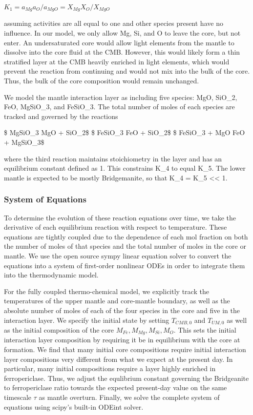 \documentclass[]{article}
\begin{document}
​ \(K_{1} = a_{Mg}a_{O} / a_{MgO} = X_{Mg} X_O / X_{MgO}\)

assuming activities are all equal to one and other species present have
no influence. In our model, we only allow Mg, Si, and O to leave the
core, but not enter. An undersaturated core would allow light elements
from the mantle to dissolve into the core fluid at the CMB. However,
this would likely form a thin stratified layer at the CMB heavily
enriched in light elements, which would prevent the reaction from
continuing and would not mix into the bulk of the core. Thus, the bulk
of the core composition would remain unchanged.

We model the mantle interaction layer as including five species: MgO,
SiO\_2, FeO, MgSiO\_3, and FeSiO\_3. The total number of moles of each
species are tracked and governed by the reactions

\$ MgSiO\_3 \leftrightarrow MgO + SiO\_2\$ \$ FeSiO\_3
\leftrightarrow FeO + SiO\_2\$ \$ FeSiO\_3 + MgO \leftrightarrow FeO +
MgSiO\_3\$

where the third reaction maintains stoichiometry in the layer and has an
equilibrium constant defined as 1. This constrains K\_4 to equal K\_5.
The lower mantle is expected to be mostly Bridgemanite, so that K\_4 =
K\_5 \textless{}\textless{} 1.

\hypertarget{system-of-equations}{%
\subsubsection{System of Equations}\label{system-of-equations}}

To determine the evolution of these reaction equations over time, we
take the derivative of each equilibrium reaction with respect to
temperature. These equations are tightly coupled due to the dependence
of each mol fraction on both the number of moles of that species and the
total number of moles in the core or mantle. We use the open source
sympy linear equation solver to convert the equations into a system of
first-order nonlinear ODEs in order to integrate them into the
thermodynamic model.

For the fully coupled thermo-chemical model, we explicitly track the
temperatures of the upper mantle and core-mantle boundary, as well as
the absolute number of moles of each of the four species in the core and
five in the interaction layer. We specify the initial state by setting
\(T_{CMB,0}\) and \(T_{UM,0}\) as well as the initial composition of the
core \(M_{Fe}, M_{Mg}, M_{Si}, M_{O}\). This sets the initial
interaction layer composition by requiring it be in equilibrium with the
core at formation. We find that many initial core compositions require
initial interaction layer compositions very different from what we
expect at the present day. In particular, many initial compositions
require a layer highly enriched in ferropericlase. Thus, we adjust the
equlibrium constant governing the Bridgeanite to ferropericlase ratio
towards the expected present-day value on the same timescale \(\tau\) as
mantle overturn. Finally, we solve the complete system of equations
using scipy's built-in ODEint solver.
\end{document}
